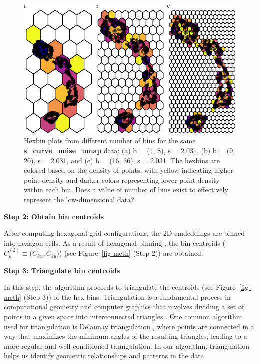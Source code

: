 \documentclass[
  12pt]{article}
\begin{document}
\begin{figure}[H]

{\centering \includegraphics{paper_files/figure-pdf/fig-binsize-1.pdf}

}

\caption{\label{fig-binsize}Hexbin plots from different number of bins
for the same \textbf{s\_curve\_noise\_umap} data: (a) b = (4, 8), s =
2.031, (b) b = (9, 20), s = 2.031, and (c) b = (16, 36), s = 2.031. The
hexbins are colored based on the density of points, with yellow
indicating higher point density and darker colors representing lower
point density within each bin. Does a value of number of bins exist to
effectively represent the low-dimensional data?}

\end{figure}

\textbf{Step 2: Obtain bin centroids}

After computing hexagonal grid configurations, the 2D emdeddings are
binned into hexagon cells. As a result of hexagonal binning , the bin
centroids (\(C_k^{(2)} \equiv (C_{kx}, C_{ky}\))) (see
Figure~\ref{fig-meth} (Step 2)) are obtained.

\textbf{Step 3: Triangulate bin centroids}

In this step, the algorithm proceeds to triangulate the centroids (see
Figure~\ref{fig-meth} (Step 3)) of the hex bins. Triangulation is a
fundamental process in computational geometry and computer graphics that
involves dividing a set of points in a given space into interconnected
triangles \citep{article30}. One common algorithm used for triangulation
is Delaunay triangulation \citep{article26}, where points are connected
in a way that maximizes the minimum angles of the resulting triangles,
leading to a more regular and well-conditioned triangulation. In our
algorithm, triangulation helps us identify geometric relationships and
patterns in the data.
\end{document}
